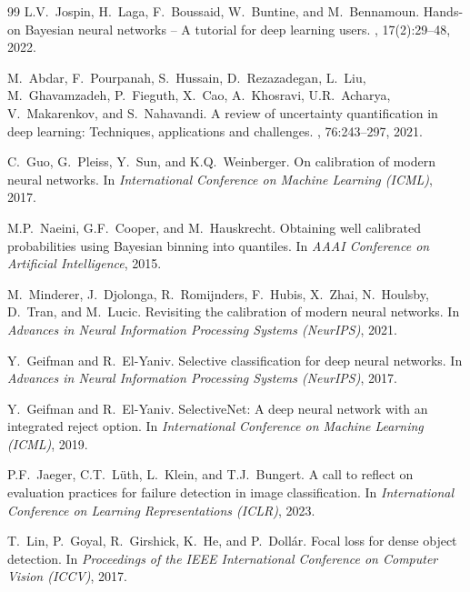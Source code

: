 \documentclass[letterpaper]{article} %
\begin{document}
\begin{thebibliography}{99}
L.V.~Jospin, H.~Laga, F.~Boussaid, W.~Buntine, and M.~Bennamoun.
\newblock Hands-on Bayesian neural networks -- A tutorial for deep learning users.
, 17(2):29--48, 2022.

M.~Abdar, F.~Pourpanah, S.~Hussain, D.~Rezazadegan, L.~Liu, M.~Ghavamzadeh, P.~Fieguth, X.~Cao, A.~Khosravi, U.R.~Acharya, V.~Makarenkov, and S.~Nahavandi.
\newblock A review of uncertainty quantification in deep learning: Techniques, applications and challenges.
, 76:243--297, 2021.


C.~Guo, G.~Pleiss, Y.~Sun, and K.Q.~Weinberger.
\newblock On calibration of modern neural networks.
\newblock In {\em International Conference on Machine Learning (ICML)}, 2017.

M.P.~Naeini, G.F.~Cooper, and M.~Hauskrecht.
\newblock Obtaining well calibrated probabilities using Bayesian binning into quantiles.
\newblock In {\em AAAI Conference on Artificial Intelligence}, 2015.

M.~Minderer, J.~Djolonga, R.~Romijnders, F.~Hubis, X.~Zhai, N.~Houlsby, D.~Tran, and M.~Lucic.
\newblock Revisiting the calibration of modern neural networks.
\newblock In {\em Advances in Neural Information Processing Systems (NeurIPS)}, 2021.


Y.~Geifman and R.~El-Yaniv.
\newblock Selective classification for deep neural networks.
\newblock In {\em Advances in Neural Information Processing Systems (NeurIPS)}, 2017.

Y.~Geifman and R.~El-Yaniv.
\newblock SelectiveNet: A deep neural network with an integrated reject option.
\newblock In {\em International Conference on Machine Learning (ICML)}, 2019.

P.F.~Jaeger, C.T.~Lüth, L.~Klein, and T.J.~Bungert.
\newblock A call to reflect on evaluation practices for failure detection in image classification.
\newblock In {\em International Conference on Learning Representations (ICLR)}, 2023.


T.~Lin, P.~Goyal, R.~Girshick, K.~He, and P.~Doll{\'a}r.
\newblock Focal loss for dense object detection.
\newblock In {\em Proceedings of the IEEE International Conference on Computer Vision (ICCV)}, 2017.


\end{thebibliography}
\end{document}
